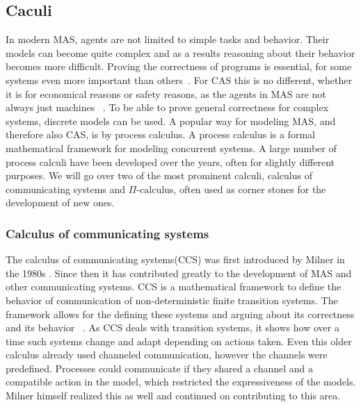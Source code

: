 \subsection{Caculi}
In modern MAS, agents are not limited to simple tasks and behavior. Their models can become quite complex and as a results reasoning about their behavior becomes more difficult. Proving the correctness of programs is essential, for some systems even more important than others~\cite{beeson1986proving}. For CAS this is no different, whether it is for economical reasons or safety reasons, as the agents in MAS are not always just machines ~\cite{van2008multi}. To be able to prove general correctness for complex systems, discrete models can be used. A popular way for modeling MAS, and therefore also CAS, is by process calculus. A process calculus is a formal mathematical framework for modeling concurrent systems. A large number of process calculi have been developed over the years, often for slightly different purposes. We will go over two of the most prominent calculi, calculus of communicating systems and $\Pi$-calculus, often used as corner stones for the development of new ones.
\\
\subsubsection{Calculus of communicating systems}
The calculus of communicating systems(CCS) was first introduced by Milner in the 1980s \cite{milner1980calculus}. Since then it has contributed greatly to the development of MAS and other communicating systems. CCS is a mathematical framework to define the behavior of communication of non-deterministic finite transition systems. The framework allows for the defining these systems and arguing about its correctness and its behavior ~\cite{koomen1991calculus}. As CCS deals with transition systems, it shows how over a time such systems change and adapt depending on actions taken. Even this older calculus already used channeled communication, however the channels were predefined. Processes could communicate if they shared a channel and a compatible action in the model, which restricted the expressiveness of the models. Milner himself realized this as well and continued on contributing to this area.
\\
